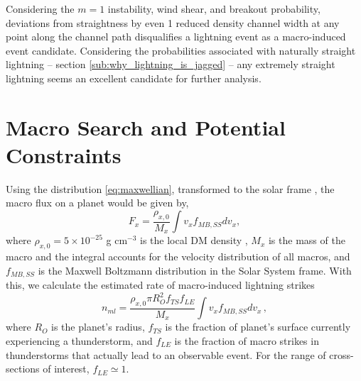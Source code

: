 \documentclass[%
 reprint,
 amsmath,amssymb,
 aps,
]{revtex4-2}
\begin{document}
        Considering the $m=1$ instability, wind shear, and breakout probability, deviations from straightness by even 1 reduced density channel width at any point along the channel path disqualifies a lightning event as a macro-induced event candidate. Considering the probabilities associated with naturally straight lightning -- section \ref{sub:why_lightning_is_jagged} -- any extremely straight lightning seems an excellent candidate for further analysis.




\section{Macro Search and Potential Constraints}  %
\label{sec:macro_search_and_constraints}

    Using the distribution \eqref{eq:maxwellian}, transformed to the solar frame \citep{Freese2013}, the macro flux on a planet would be given by,
    \begin{equation}\label{eq:planet_macro_flux}
        F_{x} = \frac{\rho_{x,0}}{M_{x}} \int v_{x} f_{MB,SS} dv_x,
    \end{equation}
    where $\rho_{x,0} = 5 \times 10^{-25}$ g cm$^{-3}$ is the local DM density \citep{Bovy2012}, $M_{x}$ is the mass of the macro and the integral accounts for the velocity distribution of all macros, and $f_{MB,SS}$ is the Maxwell Boltzmann distribution in the Solar System frame. With this, we calculate the estimated rate of macro-induced lightning strikes
    \begin{equation}\label{eq:macro_lightning_rate}
        n_{ml} = \frac{\rho_{x,0} \pi R_{O}^2 f_{TS} f_{LE}}{M_{x}}\int v_{x} f_{MB,SS} dv_x\,,
    \end{equation}
    where $R_{O}$ is the planet's radius, $f_{TS}$ is the fraction of planet's surface currently experiencing a thunderstorm, and $f_{LE}$ is the fraction of macro strikes in thunderstorms that actually lead to an observable event. For the range of cross-sections of interest, $f_{LE}\simeq1$.
\end{document}
